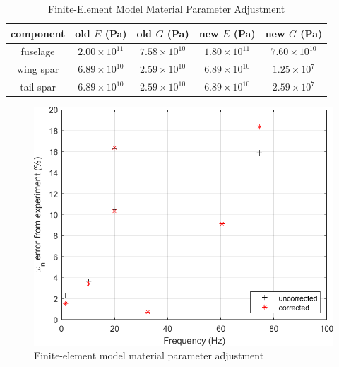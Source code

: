 \begin{table}[h]
    \centering
    \caption{Finite-Element Model Material Parameter Adjustment}
    \label{tab:gvtAdjust}
    \begin{tabular}{ccccc}
        \hline\hline
		component & old $E$ (Pa) & old $G$ (Pa) & new $E$ (Pa) & new $G$ (Pa) \\
		\hline
		fuselage  & $2.00\times10^{11}$ & $7.58\times10^{10}$ & $1.80\times10^{11}$ & $7.60\times10^{10}$ \\ 
		wing spar & $6.89\times10^{10}$ & $2.59\times10^{10}$ & $6.89\times10^{10}$ & $1.25\times10^7$ \\
		tail spar & $6.89\times10^{10}$ & $2.59\times10^{10}$ & $6.89\times10^{10}$ & $2.59\times10^7$ \\
        \hline\hline
    \end{tabular}
\end{table}

\begin{figure}
    \centering
    \label{fig:gvtAdjust}
    \includegraphics[width=5in]{figs/FEMcorrection.png}
    \caption{Finite-element model material parameter adjustment}
\end{figure}

